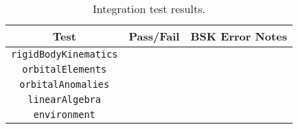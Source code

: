 \begin{table}[h]
	\caption{Integration test results.}
	\label{tbl:avsLibraryResults}
	\centering \fontsize{10}{10}\selectfont
	\begin{tabular}{c | c | l } %
		\hline\hline
		\textbf{Test} 			& \textbf{Pass/Fail} 	 & \textbf{BSK Error Notes} 									        
		\\ \hline
		{\tt rigidBodyKinematics}		  	& 
		      	  &
		
		\\ 
		{\tt orbitalElements}		  	& 
		      	  &
		
		\\ 
		{\tt orbitalAnomalies}		  	& 
		      	  &
		
		\\ 
		{\tt linearAlgebra}		  	& 
		      	  &
		
		\\ 
		{\tt environment}		  	& 
		      	  &
		
		\\ 
		\hline\hline
	\end{tabular}
\end{table}


